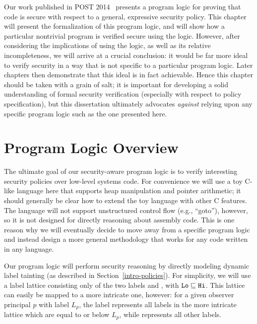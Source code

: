 \label{logic-chapter}
Our work published in POST 2014~\cite{costanzo-ddifc}
presents a program logic for proving that code is secure with respect
to a general, expressive security policy. This chapter will present the formalization of this
program logic, and will show how a particular nontrivial program is verified secure
using the logic. However, after considering the implications of using
the logic, as well as its relative incompleteness, we will arrive at
a crucial conclusion: it would be far more ideal to verify security
in a way that is not specific to a particular program logic. Later
chapters then demonstrate that this ideal is in fact achievable.
Hence this chapter should be taken with a grain of salt; it is important
for developing a solid understanding of formal security verification
(especially with respect to policy specification), but this
dissertation ultimately advocates \emph{against} relying upon any specific program 
logic such as the one presented here.

\section{Program Logic Overview}

The ultimate goal of our security-aware program logic is to verify
interesting security policies over low-level systems code. For convenience
we will use a toy C-like language here that supports heap manipulation and
pointer arithmetic; it should generally be clear how to
extend the toy language with other C features. The language will not support
unstructured control flow (e.g., ``goto''), however, so it is not designed
for directly reasoning about assembly code. This is one reason why we will
eventually decide to move away from a specific program logic and instead
design a more general methodology that works for any code written in any
language.

Our program logic will perform security reasoning by directly modeling 
dynamic label tainting (as described in Section~\ref{intro-policies}).
For simplicity, we will use a label lattice consisting only of the two
labels \lo{} and \hi{}, with $\text{\tt{Lo}}{} \sqsubseteq \text{\tt{Hi}}{}$. This lattice
can easily be mapped to a more intricate one, however: for a given observer
principal $p$ with label $L_p$, the \lo{} label represents all labels in the 
more intricate lattice which are equal to or below $L_p$, while \hi{} represents
all other labels.

